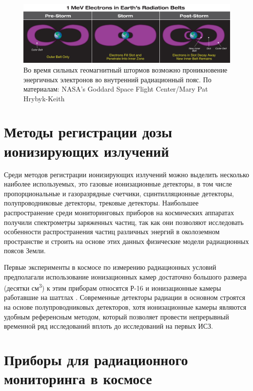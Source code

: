 \begin{figure}
	\centering
	\includegraphics[width=0.7\linewidth]{images/inner_electron_belt_illustration}
	\caption[Образование долгоживущего внутреннего электронного пояса]{ Во время сильных геомагнитный штормов возможно проникновение энергичных электронов во внутренний радиационный пояс. По материалам: NASA’s Goddard Space Flight Center/Mary Pat Hrybyk-Keith \cite{Johnson-Groh2017}}
	\label{fig:innerelectronbeltillustration}
\end{figure}

\section{Методы регистрации дозы ионизирующих излучений} \label{sect1_2}

Среди методов регистрации ионизирующих излучений можно выделить несколько наиболее используемых, это газовые ионизационные детекторы, в том числе пропорциональные и газоразрядные счетчики, сцинтилляционные детекторы, полупроводниковые детекторы, трековые детекторы. Наибольшее распространение среди мониторинговых приборов на космических аппаратах получили спектрометры заряженных частиц, так как они позволяют исследовать особенности распространения частиц различных энергий в околоземном пространстве и строить на основе этих данных физические модели радиационных поясов Земли.

Первые эксперименты в космосе по измерению радиационных условий предполагали использование ионизационных камер достаточно большого размера (десятки см\textsuperscript{3}) к этим приборам относятся Р-16 \cite{Mitricas2002} и ионизационные камеры работавшие на шаттлах \cite{Dorman2004}. Современные детекторы радиации в основном строятся на основе полупроводниковых детекторов, хотя ионизационные камеры являются удобным референсным методом, который позволяет провести непрерывный временной ряд исследований вплоть до исследований на первых ИСЗ.


\section{Приборы для радиационного мониторинга в космосе} \label{sect1_3}

